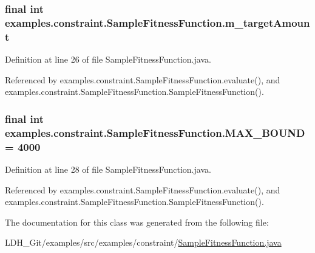 \hypertarget{classexamples_1_1constraint_1_1_sample_fitness_function_a99563b81ff4c6ed2bec9f71f4062a23c}{
\subsubsection[{m\-\_\-target\-Amount}]{\setlength{\rightskip}{0pt plus 5cm}final int examples.\-constraint.\-Sample\-Fitness\-Function.\-m\-\_\-target\-Amount\hspace{0.3cm}{\ttfamily [private]}}}\label{classexamples_1_1constraint_1_1_sample_fitness_function_a99563b81ff4c6ed2bec9f71f4062a23c}


Definition at line 26 of file Sample\-Fitness\-Function.\-java.



Referenced by examples.\-constraint.\-Sample\-Fitness\-Function.\-evaluate(), and examples.\-constraint.\-Sample\-Fitness\-Function.\-Sample\-Fitness\-Function().

\hypertarget{classexamples_1_1constraint_1_1_sample_fitness_function_abf74607a2c964f86b796e2163b441e01}{
\subsubsection[{M\-A\-X\-\_\-\-B\-O\-U\-N\-D}]{\setlength{\rightskip}{0pt plus 5cm}final int examples.\-constraint.\-Sample\-Fitness\-Function.\-M\-A\-X\-\_\-\-B\-O\-U\-N\-D = 4000\hspace{0.3cm}{\ttfamily [static]}}}\label{classexamples_1_1constraint_1_1_sample_fitness_function_abf74607a2c964f86b796e2163b441e01}


Definition at line 28 of file Sample\-Fitness\-Function.\-java.



Referenced by examples.\-constraint.\-Sample\-Fitness\-Function.\-evaluate(), and examples.\-constraint.\-Sample\-Fitness\-Function.\-Sample\-Fitness\-Function().



The documentation for this class was generated from the following file\-:\begin{DoxyCompactItemize}
\item 
L\-D\-H\-\_\-\-Git/examples/src/examples/constraint/\hyperlink{constraint_2_sample_fitness_function_8java}{Sample\-Fitness\-Function.\-java}\end{DoxyCompactItemize}
